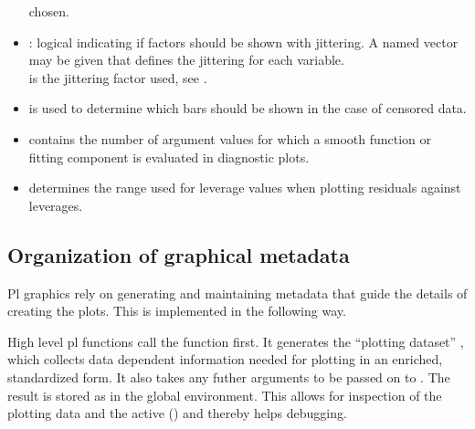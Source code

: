 \documentclass[11pt]{article}\usepackage[]{graphicx}\usepackage[]{color}
\begin{document}
\begin{itemize}
  chosen.
\item
  : logical indicating if factors should be shown with jittering.
  A named vector may be given that defines the jittering for each
  variable.\\ 
   is the jittering factor used, see .
\item
   is used to determine which bars should be shown
  in the case of censored data.
\item
   contains the number of argument values for which 
  a smooth function or fitting component is evaluated in diagnostic plots.
\item
   determines the range used for leverage values
  when plotting residuals against leverages.
\end{itemize}

\subsection{Organization of graphical metadata}
Pl graphics rely on generating and maintaining metadata that guide the
details of creating the plots. This is implemented in the following way.

High level pl functions call the function  first.
It generates the ``plotting dataset'' , which
collects data dependent information needed for plotting in an enriched,
standardized form. 
It also takes any futher arguments to be passed on to .
The result is stored as  in the global environment.
This allows for inspection of the plotting data
 and the active  ()
and thereby helps debugging.
\end{document}
